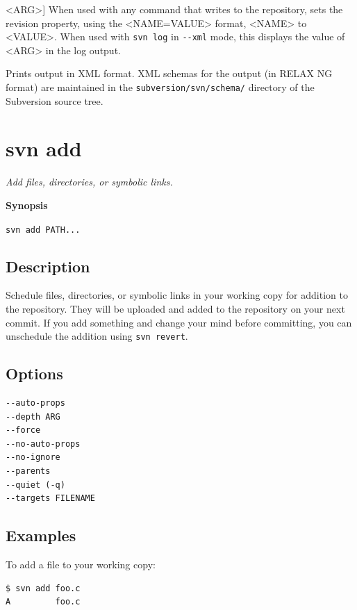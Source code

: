 \begin{description}
\textless ARG\textgreater{}]
When used with any command that writes to the repository, sets the
revision property, using the \textless NAME=VALUE\textgreater{} format,
\textless NAME\textgreater{} to \textless VALUE\textgreater. When used
with \texttt{svn\ log} in \texttt{-\/-xml} mode, this displays the value
of \textless ARG\textgreater{} in the log output.
\item[\protect\phantomsection\label{svn.ref.svn.sw.xml}{}\texttt{-\/-xml}]
Prints output in XML format. XML schemas for the output (in RELAX NG
format) are maintained in the \texttt{subversion/svn/schema/} directory
of the Subversion source tree.
\end{description}

\section{svn add}\label{svn.ref.svn.c.add}

\emph{Add files, directories, or symbolic links.}

\textbf{Synopsis}

\texttt{svn\ add\ PATH...}

\subsection{Description}

Schedule files, directories, or symbolic links in your working copy for
addition to the repository. They will be uploaded and added to the
repository on your next commit. If you add something and change your
mind before committing, you can unschedule the addition using
\texttt{svn\ revert}.

\subsection{Options}

\begin{verbatim}
--auto-props
--depth ARG
--force
--no-auto-props
--no-ignore
--parents
--quiet (-q)
--targets FILENAME
\end{verbatim}

\subsection{Examples}

To add a file to your working copy:

\begin{verbatim}
$ svn add foo.c 
A         foo.c
\end{verbatim}

